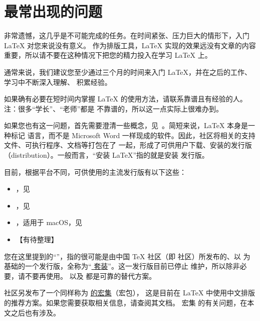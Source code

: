 %
%
%
%

\section{最常出现的问题}
\label{sec:starter}


非常遗憾，这几乎是不可能完成的任务。在时间紧张、压力巨大的情形下，入门 \LaTeX{} 对您来说没有意义。
作为排版工具，\LaTeX{} 实现的效果远没有文章的内容重要，所以请不要在这种情况下把您的精力投入在学习
\LaTeX{} 上。

通常来说，我们建议您至少通过三个月的时间来入门 \LaTeX{}，并在之后的工作、学习中不断深入理解、
积累经验。

如果确有必要在短时间内掌握 \LaTeX{} 的使用方法，请联系靠谱且有经验的人。注：很多“学长”、“老师”都是
不靠谱的，所以这一点实际上很难办到。



如果您也有这一问题，首先需要澄清一些概念，见~。简短来说，\LaTeX{} 本身是一种标记
语言，而不是 Microsoft Word 一样现成的软件。因此，社区将相关的支持文件、可执行程序、文档等打包在了
一起，形成了可供用户下载、安装的发行版（distribution）。一般而言，“安装 \LaTeX{}”指的就是安装
发行版。

目前，根据平台不同，可供使用的主流发行版有以下这些：

\begin{itemize}
  \item \TeXLive{}，见~
  \item \MiKTeX{}，见~
  \item \MacTeX{}，适用于 macOS，见~
  \item 【有待整理】
\end{itemize}



您在这里提到的“\CTeX{}”，指的很可能是由中国 \TeX{} 社区（即 \CTeX{} 社区）所发布的、以 \MiKTeX{}
为基础的一个发行版，全称为“\href{http://www.ctex.org/CTeX}{\CTeX{} 套装}”。这一发行版目前已停止
维护，所以除非必要，请不要再使用。\TeXLive{} 以及 \MiKTeX{} 都是可靠的替代方案。

\CTeX{} 社区另发布了一个同样称为 \href{https://www.ctan.org/pkg/ctex}{\CTeX{} 的宏集}（宏包），
这是目前在 \LaTeX{} 中使用中文排版的推荐方案。如果您需要获取相关信息，请查阅其文档。\CTeX{} 宏集
的有关问题，在本文之后也有涉及。
